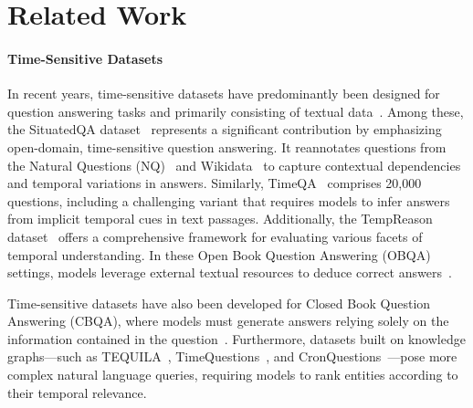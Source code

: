 \section{Related Work}
\paragraph{Time-Sensitive Datasets}
In recent years, time-sensitive datasets have predominantly been designed for question answering tasks and primarily consisting of textual data~\cite{zhang2021situatedqa,chen2021dataset,tan2023towards,liska2022streamingqa,wei2023menatqa,yang2024continual}. Among these, the SituatedQA dataset~\cite{zhang2021situatedqa} represents a significant contribution by emphasizing open-domain, time-sensitive question answering. It reannotates questions from the Natural Questions (NQ)~\cite{kwiatkowski2019natural} and Wikidata~\cite{vrandevcic2014wikidata} to capture contextual dependencies and temporal variations in answers. Similarly, TimeQA~\cite{chen2021dataset} comprises 20,000 questions, including a challenging variant that requires models to infer answers from implicit temporal cues in text passages. Additionally, the TempReason dataset~\cite{tan2023towards} offers a comprehensive framework for evaluating various facets of temporal understanding. In these Open Book Question Answering (OBQA) settings, models leverage external textual resources to deduce correct answers~\cite{izacard2020leveraging,zaheer2020big,wei2021finetuned,ouyang2022training,yang2024enhancing}.

Time-sensitive datasets have also been developed for Closed Book Question Answering (CBQA), where models must generate answers relying solely on the information contained in the question~\cite{fevry2020entities,roberts2020much,dhingra2022time}. Furthermore, datasets built on knowledge graphs—such as TEQUILA~\cite{jia2018tequila}, TimeQuestions~\cite{jia2021complex}, and CronQuestions~\cite{saxena2021question}—pose more complex natural language queries, requiring models to rank entities according to their temporal relevance.

